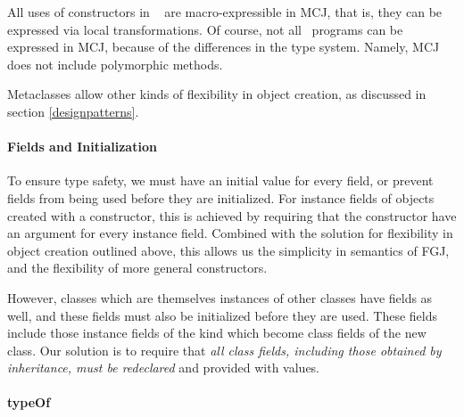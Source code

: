\documentclass{acmconfbig}
\begin{document}
All uses of constructors in \FGJ\ \cite{FJ} are macro-expressible
\cite{FellExpress} in MCJ, that is, they can be expressed via local
transformations.  Of course, not all \FGJ\ programs can be expressed
in MCJ, because of the differences in the type system. Namely, MCJ
does not include polymorphic methods.

Metaclasses allow other kinds of flexibility in object creation, as
discussed in section \ref{designpatterns}.

\paragraph{Fields and Initialization}

To ensure type safety, we must have an initial value for every field,
or prevent fields from being used before they are initialized.  For
instance fields of objects created with a constructor, this is achieved
by requiring that the constructor have an argument for every instance
field.  Combined with the solution for flexibility in object creation
outlined above, this allows us the simplicity in semantics of FGJ, and
the flexibility of more general constructors.  

However, classes which are themselves instances of other classes have
fields as well, and these fields must also be initialized before they
are used.  These fields include those instance fields of the kind
which become class fields of the new class.  Our solution is to
require that \emph{all class fields, including those obtained by
inheritance, must be redeclared} and provided with values.  




\paragraph{typeOf}
\end{document}
